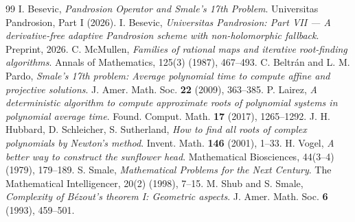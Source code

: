\documentclass[11pt,a4paper]{article}
\begin{document}
\begin{thebibliography}{99}
 I. Besevic, \textit{Pandrosion Operator and Smale's 17th Problem}. Universitas Pandrosion, Part I (2026).
 I. Besevic, \textit{Universitas Pandrosion: Part VII --- A derivative-free adaptive Pandrosion scheme with non-holomorphic fallback}. Preprint, 2026.
 C. McMullen, \textit{Families of rational maps and iterative root-finding algorithms}. Annals of Mathematics, 125(3) (1987), 467--493.
 C. Beltr\'an and L. M. Pardo, \textit{Smale's 17th problem: Average polynomial time to compute affine and projective solutions}. J. Amer. Math. Soc. \textbf{22} (2009), 363--385.
 P. Lairez, \textit{A deterministic algorithm to compute approximate roots of polynomial systems in polynomial average time}. Found. Comput. Math. \textbf{17} (2017), 1265--1292.
 J. H. Hubbard, D. Schleicher, S. Sutherland, \textit{How to find all roots of complex polynomials by Newton's method}. Invent. Math. \textbf{146} (2001), 1--33.
 H. Vogel, \textit{A better way to construct the sunflower head}. Mathematical Biosciences, 44(3--4) (1979), 179--189.
 S. Smale, \textit{Mathematical Problems for the Next Century}. The Mathematical Intelligencer, 20(2) (1998), 7--15.
 M. Shub and S. Smale, \textit{Complexity of B\'ezout's theorem I: Geometric aspects}. J. Amer. Math. Soc. \textbf{6} (1993), 459--501.
\end{thebibliography}
\end{document}
